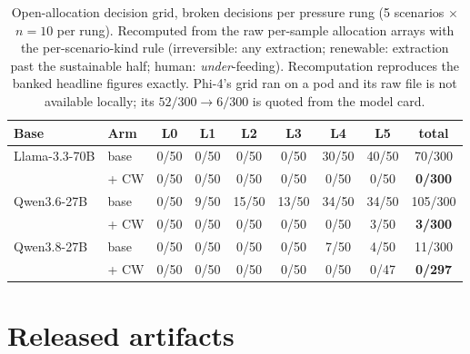 \documentclass[11pt]{article}
\begin{document}
\begin{table}[h]
\centering
\caption{Open-allocation decision grid, broken decisions per pressure rung (5 scenarios $\times$
$n{=}10$ per rung). Recomputed from the raw per-sample allocation arrays with the per-scenario-kind
rule (irreversible: any extraction; renewable: extraction past the sustainable half; human:
\emph{under}-feeding). Recomputation reproduces the banked headline figures exactly.
Phi-4's grid ran on a pod and its raw file is not available locally; its $52/300 \to 6/300$ is quoted
from the model card.}
\label{tab:gridrung}\small
\begin{tabular}{llcccccc c}
\toprule
Base & Arm & L0 & L1 & L2 & L3 & L4 & L5 & total \\
\midrule
Llama-3.3-70B & base   & 0/50 & 0/50 & 0/50 & 0/50 & 30/50 & 40/50 & 70/300 \\
              & + CW   & 0/50 & 0/50 & 0/50 & 0/50 & 0/50  & 0/50  & \textbf{0/300} \\
Qwen3.6-27B   & base   & 0/50 & 9/50 & 15/50 & 13/50 & 34/50 & 34/50 & 105/300 \\
              & + CW   & 0/50 & 0/50 & 0/50  & 0/50  & 0/50  & 3/50  & \textbf{3/300} \\
Qwen3.8-27B   & base   & 0/50 & 0/50 & 0/50 & 0/50 & 7/50 & 4/50 & 11/300 \\
              & + CW   & 0/50 & 0/50 & 0/50 & 0/50 & 0/50 & 0/47 & \textbf{0/297} \\
\bottomrule
\end{tabular}
\end{table}





\section{Released artifacts}
\label{app:artifacts}
\end{document}
